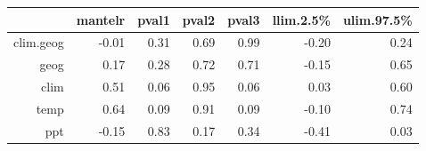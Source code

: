 \begin{table}[ht]
\centering
\begin{tabular}{rrrrrrr}
  \hline
 & mantelr & pval1 & pval2 & pval3 & llim.2.5\% & ulim.97.5\% \\ 
  \hline
clim.geog & -0.01 & 0.31 & 0.69 & 0.99 & -0.20 & 0.24 \\ 
  geog & 0.17 & 0.28 & 0.72 & 0.71 & -0.15 & 0.65 \\ 
  clim & 0.51 & 0.06 & 0.95 & 0.06 & 0.03 & 0.60 \\ 
  temp & 0.64 & 0.09 & 0.91 & 0.09 & -0.10 & 0.74 \\ 
  ppt & -0.15 & 0.83 & 0.17 & 0.34 & -0.41 & 0.03 \\ 
   \hline
\end{tabular}
\end{table}
